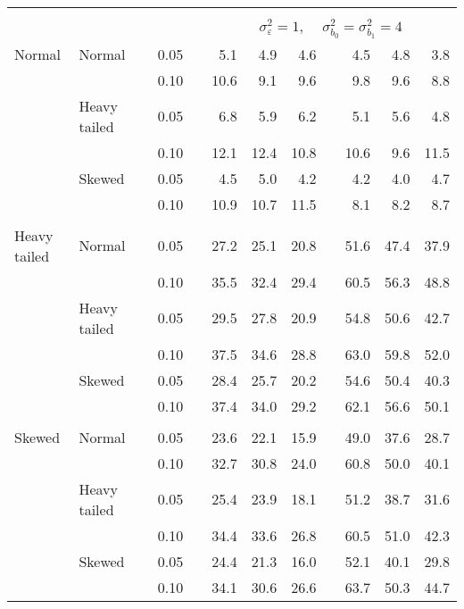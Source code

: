 \begin{table}[ht]
\begin{scriptsize}
\begin{center}
\begin{tabular}{ll p{.1cm} c p{.1cm} rrr p{.1cm} rrr}
&&&&&&&&&&&\\
& && && \multicolumn{7}{c}{$\sigma_{\varepsilon}^2 = 1$, \ \ $\sigma_{b_0}^2 = \sigma_{b_1}^2 = 4$} \\ \cline{6-12}
\rowcolor{gray!20}Normal       & Normal       && 0.05 &&   5.1 & 4.9 & 4.6 &   & 4.5 & 4.8 & 3.8 \\ 
\rowcolor{gray!20}             &              && 0.10 &&   10.6 & 9.1 & 9.6 &   & 9.8 & 9.6 & 8.8 \\ 
\rowcolor{gray!20}             & Heavy tailed && 0.05 &&   6.8 & 5.9 & 6.2 &   & 5.1 & 5.6 & 4.8 \\ 
\rowcolor{gray!20}             &              && 0.10 &&   12.1 & 12.4 & 10.8 &   & 10.6 & 9.6 & 11.5 \\ 
\rowcolor{gray!20}             & Skewed       && 0.05 &&   4.5 & 5.0 & 4.2 &   & 4.2 & 4.0 & 4.7 \\ 
\rowcolor{gray!20}             &              && 0.10 &&   10.9 & 10.7 & 11.5 &   & 8.1 & 8.2 & 8.7 \\ 
&&&&&&&&&&&\\
Heavy tailed & Normal       && 0.05 &&   27.2 & 25.1 & 20.8 &   & 51.6 & 47.4 & 37.9 \\ 
             &              && 0.10 &&   35.5 & 32.4 & 29.4 &   & 60.5 & 56.3 & 48.8 \\ 
             & Heavy tailed && 0.05 &&   29.5 & 27.8 & 20.9 &   & 54.8 & 50.6 & 42.7 \\ 
             &              && 0.10 &&   37.5 & 34.6 & 28.8 &   & 63.0 & 59.8 & 52.0 \\ 
             & Skewed       && 0.05 &&   28.4 & 25.7 & 20.2 &   & 54.6 & 50.4 & 40.3 \\ 
             &              && 0.10 &&   37.4 & 34.0 & 29.2 &   & 62.1 & 56.6 & 50.1 \\ 
&&&&&&&&&&&\\
Skewed       & Normal       && 0.05 &&   23.6 & 22.1 & 15.9 &   & 49.0 & 37.6 & 28.7 \\ 
             &              && 0.10 &&   32.7 & 30.8 & 24.0 &   & 60.8 & 50.0 & 40.1 \\ 
             & Heavy tailed && 0.05 &&   25.4 & 23.9 & 18.1 &   & 51.2 & 38.7 & 31.6 \\ 
             &              && 0.10 &&   34.4 & 33.6 & 26.8 &   & 60.5 & 51.0 & 42.3 \\ 
             & Skewed       && 0.05 &&   24.4 & 21.3 & 16.0 &   & 52.1 & 40.1 & 29.8 \\ 
             &              && 0.10 &&   34.1 & 30.6 & 26.6 &   & 63.7 & 50.3 & 44.7 \\ 


\hline
\end{tabular}
\end{center}
\end{scriptsize}
\end{table}

